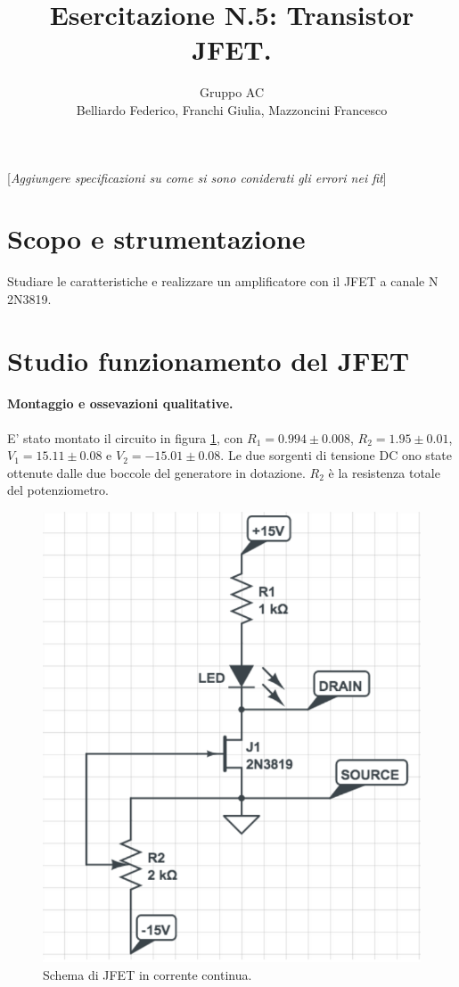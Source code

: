 \documentclass[10pt,a4paper]{article}
\author{Gruppo AC \\ Belliardo Federico, Franchi Giulia, Mazzoncini Francesco}
\title{Esercitazione N.5: Transistor JFET.}
\newcommand{\rem}[1]{[\emph{#1}]}
\begin{document}
\maketitle

\rem{Aggiungere specificazioni su come si sono coniderati gli errori nei fit}
\section{Scopo e strumentazione}
Studiare le caratteristiche e realizzare un amplificatore con il JFET a canale N 2N3819.


\section{Studio funzionamento del JFET}
\paragraph{Montaggio e ossevazioni qualitative.}
E' stato montato il circuito in figura \ref{circuito1}, con  $R_1 = 0.994\pm0.008$, $R_2 = 1.95 \pm 0.01$, $V_1 = 15.11\pm0.08 $ e $V_2 = -15.01\pm0.08$. Le due sorgenti di tensione DC ono state ottenute dalle due boccole del generatore in dotazione. $R_2$ è la resistenza totale del potenziometro.

\begin{figure}
\centering
\includegraphics[scale=0.4]{circuito1.png}
\caption{Schema di JFET in corrente continua.\label{circuito1}}
\end{figure}
\end{document}
